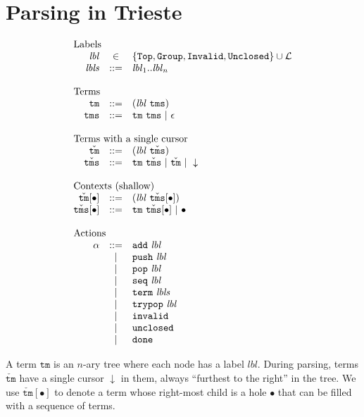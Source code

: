 \documentclass{article}
\newcommand{\labelFont}{\texttt}
\newcommand{\lbl}{\ensuremath{\mathit{lbl}}}
\newcommand{\lbls}{\ensuremath{\mathit{lbls}}}
\newcommand{\Top}{\ensuremath{\labelFont{Top}}}
\newcommand{\Group}{\ensuremath{\labelFont{Group}}}
\newcommand{\Invalid}{\ensuremath{\labelFont{Invalid}}}
\newcommand{\Unclosed}{\ensuremath{\labelFont{Unclosed}}}
\newcommand{\tm}{\ensuremath{\mathtt{tm}}}
\newcommand{\tms}{\ensuremath{\mathtt{tms}}}
\newcommand{\Tm}{\ensuremath{\check{\tm}}}
\newcommand{\Tms}{\ensuremath{\check{\tms}}}
\newcommand{\action}{\ensuremath{\alpha}}
\newcommand{\add}[1]{\ensuremath{\texttt{add}~#1}}
\newcommand{\push}[1]{\ensuremath{\texttt{push}~#1}}
\newcommand{\pop}[1]{\ensuremath{\texttt{pop}~#1}}
\newcommand{\trypop}[1]{\ensuremath{\texttt{trypop}~#1}}
\newcommand{\seq}[1]{\ensuremath{\texttt{seq}~#1}}
\newcommand{\term}[1]{\ensuremath{\texttt{term}~#1}}
\newcommand{\invalid}{\ensuremath{\texttt{invalid}}}
\newcommand{\unclosed}{\ensuremath{\texttt{unclosed}}}
\newcommand{\done}{\ensuremath{\texttt{done}}}
\newcommand{\cursor}{\ensuremath{\downarrow}}
\newcommand{\arrayheading}[2]{\multicolumn{#1}{l}{\mbox{#2}}}
\begin{document}
\section{Parsing in Trieste}

\[
  \begin{array}{rcl}
    \arrayheading{3}{Labels}\\
    \lbl  & \in & \{\Top, \Group, \Invalid, \Unclosed\}\cup \mathcal{L} \\
    \lbls & ::= & \lbl_1 .. \lbl_n\\
    \\
    \arrayheading{3}{Terms}\\
    \tm  & ::= & (\lbl~\tms) \\
    \tms & ::= & \tm ~ \tms ~|~ \epsilon \\
    \\
    \arrayheading{3}{Terms with a single cursor}\\
    \Tm  & ::= & (\lbl~\Tms)\\
    \Tms & ::= & \tm ~ \Tms ~|~ \Tm ~|~ \cursor\\
    \\
    \arrayheading{3}{Contexts (shallow)}\\
    \Tm[\bullet] & ::= & (\lbl~\Tms[\bullet])\\
    \Tms[\bullet] & ::= & \tm ~ \Tms[\bullet] ~|~ \bullet\\
    \\
    \arrayheading{3}{Actions}\\
    \action & ::= & \add{\lbl}\\
            & ~|~ & \push{\lbl}\\
            & ~|~ & \pop{\lbl}\\
            & ~|~ & \seq{\lbl}\\
            & ~|~ & \term{\lbls}\\
            & ~|~ & \trypop{\lbl}\\
            & ~|~ & \invalid\\
            & ~|~ & \unclosed\\
            & ~|~ & \done\\
  \end{array}
\]

A term \tm{} is an $n$-ary tree where each node has a label \lbl.
%
During parsing, terms \Tm{} have a single cursor \cursor{} in them,
always ``furthest to the right'' in the tree.
%
We use $\Tm[\bullet]$ to denote a term whose right-most child is a
hole $\bullet$ that can be filled with a sequence of terms.
\end{document}
